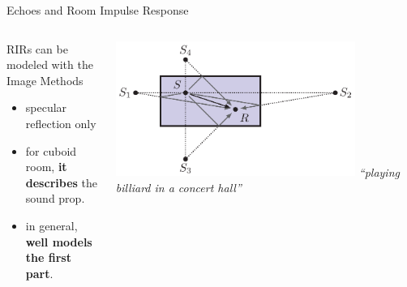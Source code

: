 \begin{frame}{Echoes and Room Impulse Response}

    \begin{columns}[onlytextwidth]
        \begin{column}{0.60\textwidth}
            \begin{block}{RIRs can be modeled with the Image Methods}
                \begin{itemize}
                    \item specular reflection only
                    \item for cuboid room, \textbf{it describes} the sound prop.
                    \item in general, \textbf{well models the first part}.
                \end{itemize}
            \end{block}
        \end{column}
        \begin{column}{0.38\textwidth}
            \centering
            \includegraphics[width=0.8\textwidth]{figures/ism.png}
            {\small\itshape ``playing billiard in a concert hall''}
        \end{column}
    \end{columns}


\end{frame}
